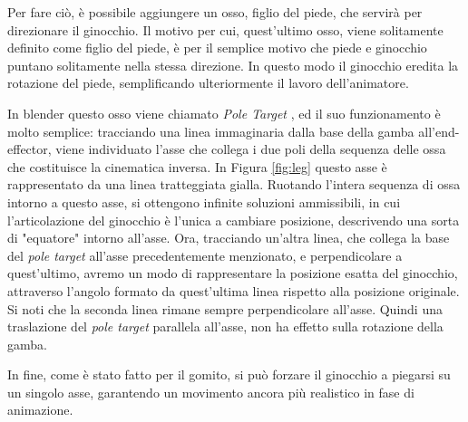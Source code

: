 Per fare ciò, è possibile aggiungere un osso, figlio del piede, che servirà per direzionare il ginocchio.
Il motivo per cui, quest'ultimo osso, viene solitamente definito come figlio del piede, è per il semplice motivo che piede e ginocchio puntano solitamente nella stessa direzione.
In questo modo il ginocchio eredita la rotazione del piede, semplificando ulteriormente il lavoro dell'animatore.

In blender questo osso viene chiamato \emph{Pole Target} \cite{blendDoc}, ed il suo funzionamento è molto semplice: tracciando una linea immaginaria dalla base della gamba all'end-effector, viene individuato l'asse che collega i due poli della sequenza delle ossa che costituisce la cinematica inversa.
In Figura \ref{fig:leg} questo asse è rappresentato da una linea tratteggiata gialla.
Ruotando l'intera sequenza di ossa intorno a questo asse, si ottengono infinite soluzioni ammissibili, in cui l'articolazione del ginocchio è l'unica a cambiare posizione, descrivendo una sorta di "equatore" intorno all'asse.
Ora, tracciando un'altra linea, che collega la base del \emph{pole target} all'asse precedentemente menzionato, e perpendicolare a quest'ultimo, avremo un modo di rappresentare la posizione esatta del ginocchio, attraverso l'angolo formato da quest'ultima linea rispetto alla posizione originale.
Si noti che la seconda linea rimane sempre perpendicolare all'asse. Quindi una traslazione del \emph{pole target} parallela all'asse, non ha effetto sulla rotazione della gamba.

In fine, come è stato fatto per il gomito, si può forzare il ginocchio a piegarsi su un singolo asse, garantendo un movimento ancora più realistico in fase di animazione.


